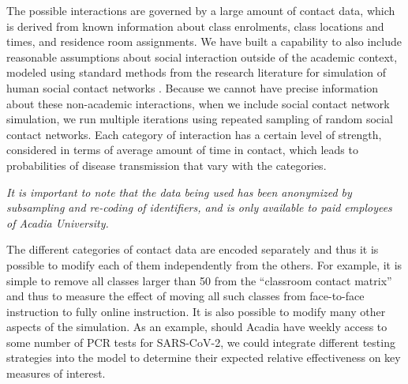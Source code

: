 \documentclass[fleqn,10pt]{SelfArx} %
\begin{document}
The possible interactions are governed by a large amount of contact data, which 
is derived from known information about class enrolments, class locations and times, and residence room assignments.
We have built a capability to also include reasonable assumptions about social interaction outside of the academic context, modeled using standard methods from the research literature for simulation of human social contact networks \cite{watts_collective_1998,schnettler_structured_2009,amblard_which_2015}. Because we cannot have precise information about these non-academic interactions, when we include social contact network simulation, we run multiple iterations using repeated sampling of random social contact networks.
Each category of interaction has a certain level of strength, considered in terms of average amount of time in contact, which leads to probabilities of disease transmission that vary with the categories.

\emph{It is important to note that the data being used has been anonymized by subsampling and re-coding of identifiers, and is only available to paid employees of Acadia University.}

The different categories of contact data are encoded separately and thus it is possible to modify each of them independently from the others.
For example, it is simple to remove all classes larger than 50 from the ``classroom contact matrix'' and thus to measure the effect of moving all such classes from face-to-face instruction to fully online instruction.
It is also possible to modify many other aspects of the simulation.
As an example, should Acadia have weekly access to some number of PCR tests for SARS-CoV-2, we could  integrate different testing strategies into the model to determine their expected relative effectiveness %
on key measures of interest.  
\end{document}
